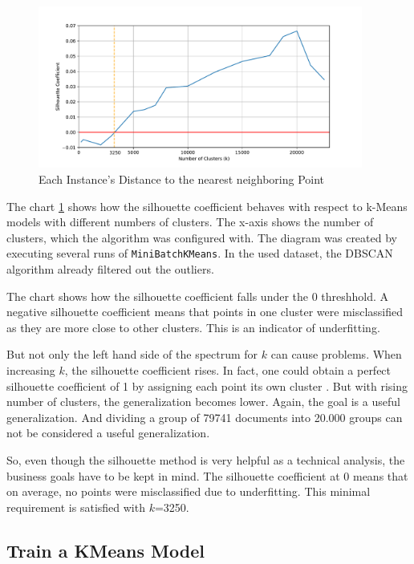  \begin{figure}[!h]
	\centering
	\includegraphics[width=0.95\textwidth]{Bilder/models/elbow.pdf}
	\caption{Each Instance's Distance to the nearest neighboring Point}
	\label{fig:silhouette}
\end{figure}

The chart \ref{fig:silhouette} shows how the silhouette coefficient behaves with respect to k-Means models with different numbers of clusters. The x-axis shows the number of clusters, which the algorithm was configured with. The diagram was created by executing several runs of \lstinline|MiniBatchKMeans|. In the used dataset, the DBSCAN algorithm already filtered out the outliers.

The chart shows how the silhouette coefficient falls under the 0 threshhold. A negative silhouette coefficient means that points in one cluster were misclassified as they are more close to other clusters. This is an indicator of underfitting. 

But not only the left hand side of the spectrum for $k$ can cause problems. When increasing $k$, the silhouette coefficient rises. In fact, one could obtain a perfect silhouette coefficient of 1 by assigning each point its own cluster \cite{yildirimTwoChallengesKMeans2020}. But with rising number of clusters, the generalization becomes lower. Again, the goal is a useful generalization. And dividing a group of 79741 documents into 20.000 groups can not be considered a useful generalization.

So, even though the silhouette method is very helpful as a technical analysis, the business goals have to be kept in mind. The silhouette coefficient at 0 means that on average, no points were misclassified due to underfitting. This minimal requirement is satisfied with $k$=3250.

\subsection{Train a KMeans Model}

